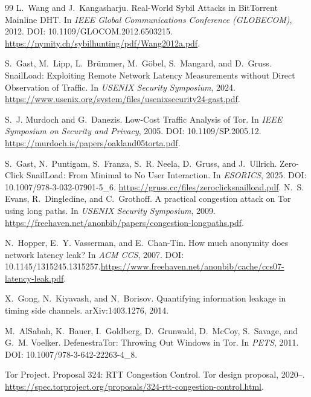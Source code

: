 \documentclass[11pt]{article}
\theoremstyle{definition}
\theoremstyle{remark}
\begin{document}
\begin{thebibliography}{99}
L.~Wang and J.~Kangasharju.
\newblock Real-World Sybil Attacks in BitTorrent Mainline DHT.
\newblock In \emph{IEEE Global Communications Conference (GLOBECOM)}, 2012.
\newblock DOI: 10.1109/GLOCOM.2012.6503215.
\newblock \url{https://nymity.ch/sybilhunting/pdf/Wang2012a.pdf}.

S.~Gast, M.~Lipp, L.~Br\"ummer, M.~G\"obel, S.~Mangard, and D.~Gruss.
\newblock SnailLoad: Exploiting Remote Network Latency Measurements without Direct Observation of Traffic.
\newblock In \emph{USENIX Security Symposium}, 2024.
\newblock \url{https://www.usenix.org/system/files/usenixsecurity24-gast.pdf}.

S.~J. Murdoch and G.~Danezis.
\newblock Low-Cost Traffic Analysis of Tor.
\newblock In \emph{IEEE Symposium on Security and Privacy}, 2005.
\newblock DOI: 10.1109/SP.2005.12.
\newblock \url{https://murdoch.is/papers/oakland05torta.pdf}.


S.~Gast, N.~Puntigam, S.~Franza, S.~R. Neela, D.~Gruss, and J.~Ullrich.
\newblock Zero-Click SnailLoad: From Minimal to No User Interaction.
\newblock In \emph{ESORICS}, 2025.
\newblock DOI: 10.1007/978-3-032-07901-5\_6.
\newblock \url{https://gruss.cc/files/zeroclicksnailload.pdf}.
N.~S. Evans, R.~Dingledine, and C.~Grothoff.
\newblock A practical congestion attack on Tor using long paths.
\newblock In \emph{USENIX Security Symposium}, 2009.
\newblock \url{https://freehaven.net/anonbib/papers/congestion-longpaths.pdf}.

N.~Hopper, E.~Y. Vasserman, and E.~Chan-Tin.
\newblock How much anonymity does network latency leak?
\newblock In \emph{ACM CCS}, 2007.
\newblock DOI: 10.1145/1315245.1315257.\newblock \url{https://www.freehaven.net/anonbib/cache/ccs07-latency-leak.pdf}.

X.~Gong, N.~Kiyavash, and N.~Borisov.
\newblock Quantifying information leakage in timing side channels.
\newblock arXiv:1403.1276, 2014.

M.~AlSabah, K.~Bauer, I.~Goldberg, D.~Grunwald, D.~McCoy, S.~Savage, and G.~M. Voelker.
\newblock DefenestraTor: Throwing Out Windows in Tor.
\newblock In \emph{PETS}, 2011.
\newblock DOI: 10.1007/978-3-642-22263-4\_8.

Tor Project.
\newblock Proposal 324: RTT Congestion Control.
\newblock Tor design proposal, 2020--.
\newblock \url{https://spec.torproject.org/proposals/324-rtt-congestion-control.html}.


\end{thebibliography}
\end{document}
